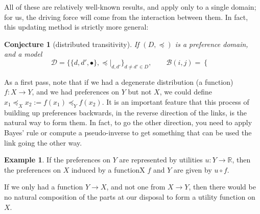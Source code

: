 \documentclass{article}
\theoremstyle{plain}
\newtheorem{conj}[theorem]{Conjecture}
\theoremstyle{definition}
\newtheorem{example}{Example}[section]
\theoremstyle{remark}
\newcommand\leqc{\preccurlyeq}
\begin{document}
	All of these are relatively well-known results, and apply only to a single domain; for us, the driving force will come from the interaction between them. In fact, this updating method is strictly more general:

	\begin{conj}[distributed transitivity]
		If $(D, \leqc)$ is a preference domain, and a model 
		\[ \mathcal D = \Big\{ \{d, d', \bullet\}, \leqc\Big|_{d,d'} \Big\}_{d \neq d' \in D},\qquad
			\mathcal B(i,j) = \begin{cases}
				
			\end{cases}
			\] 
	\end{conj}
	
	As a first pass, note that if we had a degenerate distribution (a function) $f : X \to Y$, and we had preferences on $Y$ but not $X$, we could define $x_1 \leqc_X x_2 := f(x_1) \leqc_Y f(x_2)$. It is an important feature that this process of building up preferences backwards, in the reverse direction of the links, is the natural way to form them. In fact, to go the other direction, you need to apply Bayes' rule or compute a pseudo-inverse to get something that can be used the link going the other way. 
	
	\begin{example}
		If the preferences on $Y$ are represented by utilities $u : Y \to \mathbb R$, then the preferences on $X$ induced by a functionX $f$ and $Y$ are given by $u \circ f$. 
		
		\begin{center}
		\end{center}
		
		If we only had a function $Y \to X$, and not one from $X \to Y$, then there would be no natural composition of the parts at our disposal to form a utility function on $X$.
	\end{example} 
	
	\vspace{1.5em}	
\end{document}
